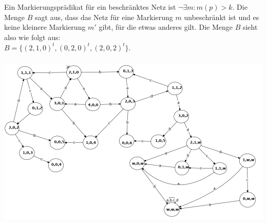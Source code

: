 \documentclass[a4paper,12pt]{scrartcl}
\title{\blatt}
\date{Gruppe 06}
\author{Sabrina Buczko 6663234, Julian Deinert 6535880, Rafael Heid 6704828}
\begin{document}
\maketitle
\newpage
\setcounter{section}{8}
\section{}
\setcounter{subsection}{2}
\subsection{}

\subsubsection{}
Ein Markierungsprädikat für ein beschränktes Netz ist $\neg\exists m:m(p)>k$.
Die Menge $B$ sagt aus, dass das Netz für eine Markierung
$m$ unbeschränkt ist und es keine kleinere
 Markierung $m'$ gibt, für die etwas anderes gilt. Die Menge $B$ sieht also wie folgt aus:\\
 $B = \{(2,1,0)^t,(0,2,0)^t,(2,0,2)^t\}$.
\subsubsection{}
\includegraphics[scale=0.5]{netz.png}
\newpage
\subsection{}
\end{document}
